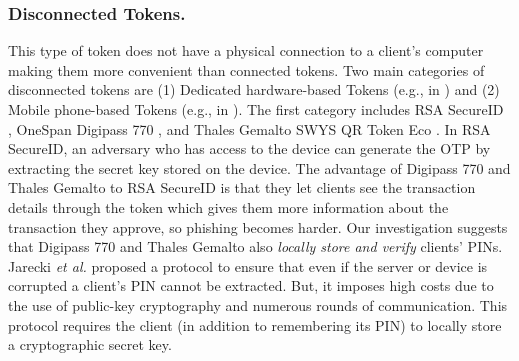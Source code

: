 \vspace{-4mm}
\subsubsection{Disconnected Tokens.}

This type of token does not have a physical connection to a client's computer making them more convenient than connected tokens. Two main categories of disconnected tokens are (1) Dedicated hardware-based Tokens (e.g., in \cite{secureID,Digipass-website,Gemalto}) and (2) Mobile phone-based Tokens (e.g., in \cite{SARA22,KoganMB17,KonothFFARB20}). The first category includes RSA SecureID \cite{secureID}, OneSpan Digipass 770 \cite{Digipass-website}, and Thales Gemalto SWYS QR Token Eco \cite{Gemalto}. In RSA SecureID, an adversary who has access to the device can generate the OTP by extracting the secret key stored on the device.  The advantage of  Digipass 770 and Thales Gemalto to RSA SecureID is that they let clients see the transaction details through the token which gives them more information about the transaction they approve, so phishing becomes harder. 
%
Our investigation suggests that Digipass 770 and Thales Gemalto also \emph{locally store and verify} clients' PINs. Jarecki \textit{et al.} \cite{JareckiJKSS21} proposed a protocol to ensure that even if the server or device is corrupted a client's PIN cannot be extracted. But, it imposes high costs due to the use of public-key cryptography and numerous rounds of communication. This protocol requires the client (in addition to remembering its PIN) to locally store a cryptographic secret key. 







%

